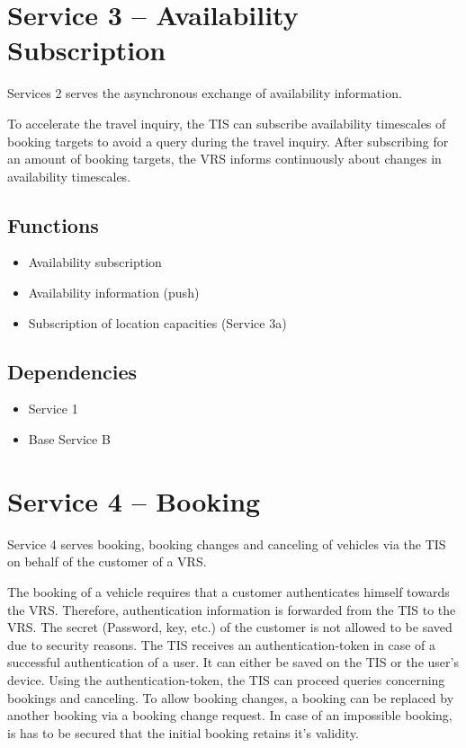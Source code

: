\section{Service 3 -- Availability Subscription}
\label{sec:Hierachiemodell:Dienst3}
Services 2 serves the asynchronous exchange of availability information.

To accelerate the travel inquiry, the TIS can subscribe availability timescales of booking targets to avoid a query during the travel inquiry. After subscribing for an amount of booking targets, the VRS informs continuously about changes in availability timescales. 

\subsection*{Functions}
\begin{itemize}
\item Availability subscription
\item Availability information (push)
\item Subscription of location capacities (Service 3a)
\end{itemize}

\subsection*{Dependencies}
\begin{itemize}
\item Service 1
\item Base Service B
\end{itemize}


\section{Service 4 -- Booking}
\label{sec:Hierachiemodell:Dienst4}
Service 4 serves booking, booking changes and canceling of vehicles via the TIS on behalf of the customer of a VRS.

The booking of a vehicle requires that a customer authenticates himself towards the VRS. Therefore, authentication information is forwarded from the TIS to the VRS. The secret (Password, key, etc.) of the customer is not allowed to be saved due to security reasons. The TIS receives an authentication-token in case of a successful authentication of a user. It can either be saved on the TIS or the user's device. Using the authentication-token, the TIS can proceed queries concerning bookings and canceling. 
To allow booking changes, a booking can be replaced by another booking via a booking change request. In case of an impossible booking, is has to be secured that the initial booking retains it's validity. 

